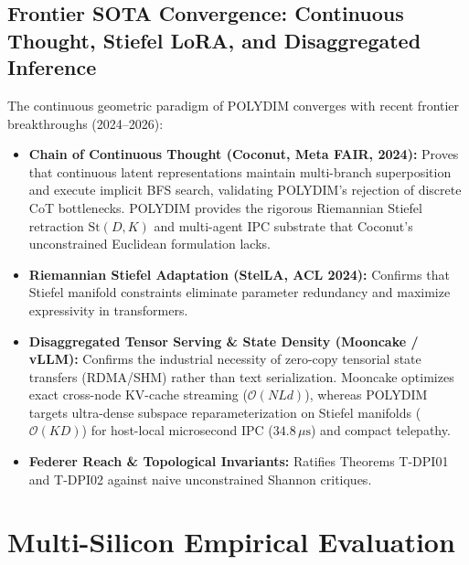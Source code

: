 \documentclass[journal,10pt,compsoc]{IEEEtran}
\theoremstyle{plain}
\theoremstyle{definition}
\begin{document}
\subsection{Frontier SOTA Convergence: Continuous Thought, Stiefel LoRA, and Disaggregated Inference}
\label{subsec:sota_convergence}
The continuous geometric paradigm of POLYDIM converges with recent frontier breakthroughs (2024--2026):
\begin{itemize}
    \item \textbf{Chain of Continuous Thought (Coconut, Meta FAIR, 2024):} Proves that continuous latent representations maintain multi-branch superposition and execute implicit BFS search, validating POLYDIM's rejection of discrete CoT bottlenecks. POLYDIM provides the rigorous Riemannian Stiefel retraction $\mathrm{St}(D, K)$ and multi-agent IPC substrate that Coconut's unconstrained Euclidean formulation lacks.
    \item \textbf{Riemannian Stiefel Adaptation (StelLA, ACL 2024):} Confirms that Stiefel manifold constraints eliminate parameter redundancy and maximize expressivity in transformers.
    \item \textbf{Disaggregated Tensor Serving \& State Density (Mooncake / vLLM):} Confirms the industrial necessity of zero-copy tensorial state transfers (RDMA/SHM) rather than text serialization. Mooncake optimizes exact cross-node KV-cache streaming ($\mathcal{O}(N L d)$), whereas POLYDIM targets ultra-dense subspace reparameterization on Stiefel manifolds ($\mathcal{O}(K D)$) for host-local microsecond IPC ($34.8\,\mu\text{s}$) and compact telepathy.
    \item \textbf{Federer Reach \& Topological Invariants:} Ratifies Theorems T-DPI01 and T-DPI02 against naive unconstrained Shannon critiques.
\end{itemize}

\section{Multi-Silicon Empirical Evaluation}
\label{sec:empirical}
\end{document}
